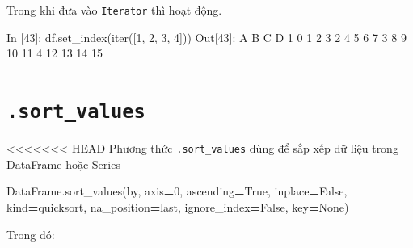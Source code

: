 \documentclass[
]{book}
\newenvironment{Shaded}{\begin{snugshade}}{\end{snugshade}}
\newcommand{\BuiltInTok}[1]{#1}
\newcommand{\DecValTok}[1]{\textcolor[rgb]{0.00,0.00,0.81}{#1}}
\newcommand{\NormalTok}[1]{#1}
\newcommand{\OperatorTok}[1]{\textcolor[rgb]{0.81,0.36,0.00}{\textbf{#1}}}
\newcommand{\StringTok}[1]{\textcolor[rgb]{0.31,0.60,0.02}{#1}}
\newcommand{\VariableTok}[1]{\textcolor[rgb]{0.00,0.00,0.00}{#1}}
\begin{document}
Trong khi đưa vào \texttt{Iterator} thì hoạt động.

\begin{Shaded}
\begin{Highlighting}[]
\NormalTok{In [}\DecValTok{43}\NormalTok{]: df.set\_index(}\BuiltInTok{iter}\NormalTok{([}\DecValTok{1}\NormalTok{, }\DecValTok{2}\NormalTok{, }\DecValTok{3}\NormalTok{, }\DecValTok{4}\NormalTok{]))}
\NormalTok{Out[}\DecValTok{43}\NormalTok{]:}
\NormalTok{    A   B   C   D}
\DecValTok{1}   \DecValTok{0}   \DecValTok{1}   \DecValTok{2}   \DecValTok{3}
\DecValTok{2}   \DecValTok{4}   \DecValTok{5}   \DecValTok{6}   \DecValTok{7}
\DecValTok{3}   \DecValTok{8}   \DecValTok{9}  \DecValTok{10}  \DecValTok{11}
\DecValTok{4}  \DecValTok{12}  \DecValTok{13}  \DecValTok{14}  \DecValTok{15}
\end{Highlighting}
\end{Shaded}

\section{\texorpdfstring{\texttt{.sort\_values}}{.sort\_values}}\label{sort_values}

\textless\textless\textless\textless\textless\textless\textless{} HEAD
Phương thức \texttt{.sort\_values} dùng để sắp xếp dữ liệu trong DataFrame hoặc Series

\begin{Shaded}
\begin{Highlighting}[]
\NormalTok{DataFrame.sort\_values(by, axis}\OperatorTok{=}\DecValTok{0}\NormalTok{, ascending}\OperatorTok{=}\VariableTok{True}\NormalTok{, inplace}\OperatorTok{=}\VariableTok{False}\NormalTok{, kind}\OperatorTok{=}\StringTok{\textquotesingle{}quicksort\textquotesingle{}}\NormalTok{, na\_position}\OperatorTok{=}\StringTok{\textquotesingle{}last\textquotesingle{}}\NormalTok{, ignore\_index}\OperatorTok{=}\VariableTok{False}\NormalTok{, key}\OperatorTok{=}\VariableTok{None}\NormalTok{)}
\end{Highlighting}
\end{Shaded}

Trong đó:
\end{document}
